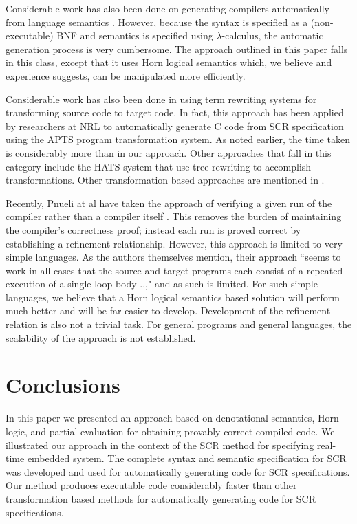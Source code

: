 \documentclass{entcs}
\begin{document}
Considerable work has also been done on generating compilers
automatically from language semantics \cite{schmidt}.  
However, because the syntax is specified as a (non-executable) BNF and semantics
is specified using $\lambda$-calculus, the automatic generation process
is very cumbersome. The approach outlined in this paper falls in this
class, except that it uses Horn logical semantics which, we believe and
experience suggests, can be manipulated more efficiently.

Considerable work has also been done in using term rewriting systems
for transforming source code to target code. In fact,
this approach has been applied by researchers at NRL to automatically
generate C code from SCR specification using the APTS \cite{apts}
program transformation system. As noted earlier, the time taken is
considerably more than in our approach. Other approaches that fall in
this category include the HATS system \cite{hats} that use tree rewriting
to accomplish transformations. Other transformation based approaches
are mentioned in \cite{Elizabeth02}.

Recently, Pnueli at al have taken the approach of verifying a given
run of the compiler rather than a compiler itself \cite{pnueli}.
This removes the burden of maintaining the compiler's correctness proof; 
instead each run is proved correct by establishing a refinement 
relationship.  However, this approach is limited to very simple languages.
As the authors themselves mention, their approach ``seems to work in all cases that the source
and target programs each consist of a repeated execution of a single
loop body ..,"  and as such is limited. For such simple languages, we believe that
a Horn logical semantics based solution will perform much better 
and will be far easier to develop. Development of the
refinement relation is also not a trivial task. For general programs and general 
languages, the scalability of the approach is not established.

\section{Conclusions}

In this paper we presented an approach based on denotational
semantics, Horn logic, and partial evaluation for obtaining
provably correct compiled code. We illustrated
our approach in the context of the SCR method for specifying
real-time embedded system. The complete syntax and semantic
specification for SCR was developed and used for automatically
generating code for SCR specifications. Our method produces 
executable code considerably faster than other transformation
based methods for automatically generating code for SCR specifications.
\end{document}
